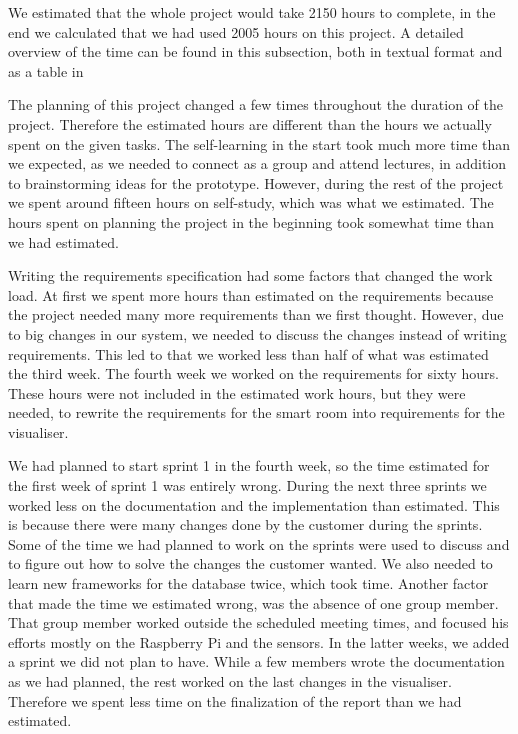 \documentclass[../document]{subfiles}
\begin{document}
We estimated that the whole project would take 2150 hours to complete, in the end we calculated that we had used 2005 hours on this project. A detailed overview of the time can be found in this subsection, both in textual format and as a table in 


The planning of this project changed a few times throughout the duration of the project. Therefore the estimated hours are different than the hours we actually spent on the given tasks. The self-learning in the start took much more time than we expected, as we needed to connect as a group and attend lectures, in addition to brainstorming ideas for the prototype. However, during the rest of the project we spent around fifteen hours on self-study, which was what we estimated. The hours spent on planning the project in the beginning took somewhat time than we had estimated. 

Writing the requirements specification had some factors that changed the work load. At first we spent more hours than estimated on the requirements because the project needed many more requirements than we first thought. However, due to big changes in our system, we needed to discuss the changes instead of writing requirements. This led to that we worked less than half of what was estimated the third week. The fourth week we worked on the requirements for sixty hours. These hours were not included in the estimated work hours, but they were needed, to rewrite the requirements for the smart room into requirements for the visualiser.

We had planned to start sprint 1 in the fourth week, so the time estimated for the first week of sprint 1 was entirely wrong. During the next three sprints we worked less on the documentation and the implementation than estimated. This is because there were many changes done by the customer during the sprints. Some of the time we had planned to work on the sprints were used to discuss and to figure out how to solve the changes the customer wanted. We also needed to learn new frameworks for the database twice, which took time. Another factor that made the time we estimated wrong, was the absence of one group member. That group member worked outside the scheduled meeting times, and focused his efforts mostly on the \gls{Raspberry Pi} and the sensors. In the latter weeks, we added a sprint we did not plan to have. While a few members wrote the documentation as we had planned, the rest worked on the last changes in the visualiser. Therefore we spent less time on the finalization of the report than we had estimated. 
\end{document}
